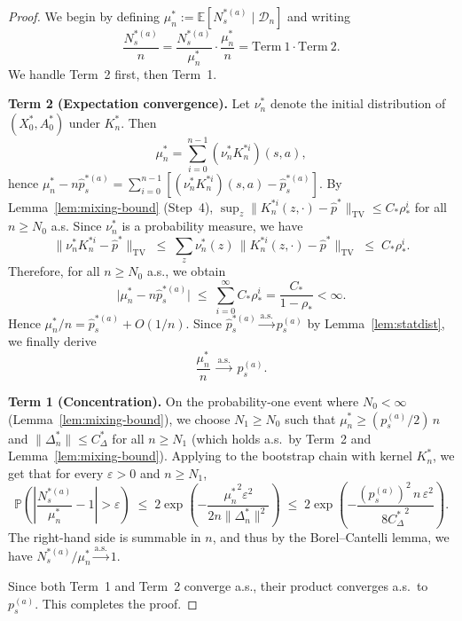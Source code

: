 \documentclass{article}
\numberwithin{equation}{section}
\begin{document}
\begin{proof}
We begin by defining $\mu_n^\ast := \mathbb{E}[N_s^{\ast(a)}\mid\mathcal{D}_n]$ and writing
\[
\frac{N_s^{\ast(a)}}{n}
= \frac{N_s^{\ast(a)}}{\mu_n^\ast} \cdot \frac{\mu_n^\ast}{n}
= \mathrm{Term~1} \cdot \mathrm{Term~2}.
\]
We handle Term~2 first, then Term~1.

\medskip\noindent\textbf{Term 2 (Expectation convergence).}
Let $\nu_n^\ast$ denote the initial distribution of $(X_0^\ast,A_0^\ast)$ under $K_n^\ast$. Then
\[
\mu_n^\ast
= \sum_{i=0}^{n-1}(\nu_n^\ast K_n^{\ast i})(s,a),
\]
hence $\mu_n^\ast - n\hat p_s^{\ast(a)} = \sum_{i=0}^{n-1}[(\nu_n^\ast K_n^{\ast i})(s,a) - \hat p_s^{\ast(a)}]$.
By Lemma~\ref{lem:mixing-bound} (Step~4), $\sup_z\|K_n^{\ast i}(z,\cdot)-\hat p^\ast\|_{\mathrm{TV}}\le C_\ast\rho_\ast^i$ for all $n\ge N_0$ a.s. Since $\nu_n^\ast$ is a probability measure, we have
\[
\|\nu_n^\ast K_n^{\ast i}-\hat p^\ast\|_{\mathrm{TV}}
\;\le\; \sum_z \nu_n^\ast(z)\,\bigl\|K_n^{\ast i}(z,\cdot)-\hat p^\ast\bigr\|_{\mathrm{TV}}
\;\le\; C_\ast\rho_\ast^i.
\]
Therefore, for all $n\ge N_0$ a.s., we obtain
\[
\bigl|\mu_n^\ast - n\hat p_s^{\ast(a)}\bigr|
\;\le\; \sum_{i=0}^{\infty}C_\ast\rho_\ast^i = \frac{C_\ast}{1-\rho_\ast} < \infty.
\]
Hence $\mu_n^\ast/n = \hat p_s^{\ast(a)} + O(1/n)$. Since $\hat p_s^{\ast(a)}\xrightarrow{\mathrm{a.s.}}p_s^{(a)}$ by Lemma~\ref{lem:statdist}, we finally derive
\[
\frac{\mu_n^\ast}{n} \;\xrightarrow{\mathrm{a.s.}}\; p_s^{(a)}.
\]

\medskip\noindent\textbf{Term 1 (Concentration).}
On the probability-one event where $N_0<\infty$ (Lemma~\ref{lem:mixing-bound}), we choose $N_1\ge N_0$ such that $\mu_n^\ast\ge(p_s^{(a)}/2)\,n$ and $\|\Delta_n^\ast\|\le C_\Delta^\ast$ for all $n\ge N_1$ (which holds a.s.\ by Term~2 and Lemma~\ref{lem:mixing-bound}). Applying \citet[Lemma~6]{banerjee2025off} to the bootstrap chain with kernel $K_n^\ast$, we get that for every $\varepsilon>0$ and $n\ge N_1$,
\[
\mathbb{P}\!\left(\left|\frac{N_s^{\ast(a)}}{\mu_n^\ast}-1\right|>\varepsilon\right)
\;\le\;
2\exp\!\left(-\frac{{\mu_n^\ast}^2\varepsilon^2}{2n\|\Delta_n^\ast\|^2}\right)
\;\le\;
2\exp\!\left(-\frac{(p_s^{(a)})^2\,n\,\varepsilon^2}{8{C_\Delta^\ast}^2}\right).
\]
The right-hand side is summable in $n$, and thus by the Borel--Cantelli lemma, we have $N_s^{\ast(a)}/\mu_n^\ast\xrightarrow{\mathrm{a.s.}}1$.

Since both Term~1 and Term~2 converge a.s., their product converges a.s.\ to $p_s^{(a)}$.
This completes the proof.
\end{proof}
\end{document}
